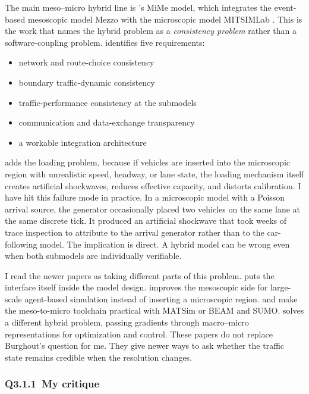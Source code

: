 \begin{bibunit}[plainnat]
The main meso--micro hybrid line is \citet{burghout2004thesis}'s MiMe model, which integrates the event-based mesoscopic model Mezzo with the microscopic model MITSIMLab \citep{burghout2005hybrid,burghout2006discrete}. This is the work that names the hybrid problem as a \textit{consistency problem} rather than a software-coupling problem. \citet{burghout2004thesis} identifies five requirements:
\begin{itemize}
  \item network and route-choice consistency
  \item boundary traffic-dynamic consistency
  \item traffic-performance consistency at the submodels
  \item communication and data-exchange transparency
  \item a workable integration architecture
\end{itemize}
\citet{burghout2006loading} adds the loading problem, because if vehicles are inserted into the microscopic region with unrealistic speed, headway, or lane state, the loading mechanism itself creates artificial shockwaves, reduces effective capacity, and distorts calibration. I have hit this failure mode in practice. In a microscopic model with a Poisson arrival source, the generator occasionally placed two vehicles on the same lane at the same discrete tick. It produced an artificial shockwave that took weeks of trace inspection to attribute to the arrival generator rather than to the car-following model. The implication is direct. A hybrid model can be wrong even when both submodels are individually verifiable.

I read the newer papers as taking different parts of this problem. \citet{gomes2022otm} puts the interface itself inside the model design. \citet{desouza2019mesoscopic} improves the mesoscopic side for large-scale agent-based simulation instead of inserting a microscopic region. \citet{schweizer2024hybridpy} and \citet{schuhmann2025hybrid} make the meso-to-micro toolchain practical with MATSim or BEAM and SUMO. \citet{son2022differentiable} solves a different hybrid problem, passing gradients through macro--micro representations for optimization and control. These papers do not replace Burghout's question for me. They give newer ways to ask whether the traffic state remains credible when the resolution changes.

\subsubsection{Q3.1.1\ My critique}


\end{bibunit}
